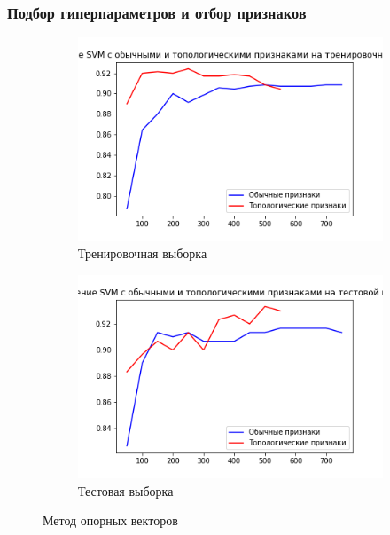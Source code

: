 \documentclass{beamer}
\begin{document}
			\begin{frame}
				\frametitle{Подбор гиперпараметров и отбор признаков}
				\begin{figure}
					\begin{subfigure}{0.48\textwidth}
						\includegraphics[width=\linewidth]{svm_diff_features_train.png}
						\caption{Тренировочная выборка}
						\label{fig:1}
					\end{subfigure}%
					\begin{subfigure}{0.48\textwidth}
						\includegraphics[width=\linewidth]{svm_diff_features_test.png}
						\caption{Тестовая выборка}
						\label{fig:2}
					\end{subfigure}
				\caption{Метод опорных векторов}
				\end{figure}
			\end{frame}
\end{document}
